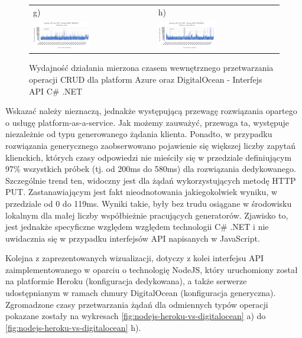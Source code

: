 \begin{figure}[htb]
\begin{tabular}{@{}ll@{}}
    g) & h) \\
    \includegraphics[width=0.49\textwidth]{rys05/dotnet-delete-azure.pdf} & \includegraphics[width=0.49\textwidth]{rys05/dotnet-delete-digitalocean.pdf} \\
	\end{tabular}
  \caption{Wydajność działania mierzona czasem wewnętrznego przetwarzania operacji CRUD dla platform Azure oraz DigitalOcean - Interfejs API C\# .NET}
  \label{fig:dotnet-azure-vs-digitalocean}
\end{figure}

Wskazać należy nieznaczą, jednakże występującą przewagę rozwiązania opartego o usługę platform-as-a-service. Jak możemy zauważyć, przewaga ta, występuje niezależnie od typu generowanego żądania klienta. Ponadto, w przypadku rozwiązania generycznego zaobserwowano pojawienie się większej liczby zapytań klienckich, których czasy odpowiedzi nie mieściły się w przedziale definiującym 97\% wszystkich próbek (tj. od 200ms do 580ms) dla rozwiązania dedykowanego. Szczególnie trend ten, widoczny jest dla żądań wykorzystujących metodę HTTP PUT. Zastanawiającym jest fakt nieodnotowania jakiegokolwiek wyniku, w przedziale od 0 do 119ms. Wyniki takie, były bez trudu osiągane w środowisku lokalnym dla małej liczby współbieżnie pracujących generatorów. Zjawisko to, jest jednakże specyficzne względem względem technologii C\# .NET i nie uwidacznia się w przypadku interfejsów API napisanych w JavaScript.

Kolejna z zaprezentowanych wizualizacji, dotyczy z kolei interfejsu API zaimplementowanego w oparciu o technologię NodeJS, który uruchomiony został na platformie Heroku (konfiguracja dedykowana), a także serwerze udostępnianym w ramach chmury DigitalOcean (konfiguracja generyczna). Zgromadzone czasy przetwarzania żądań dla odmiennych typów operacji pokazane zostały na wykresach \ref{fig:nodejs-heroku-vs-digitalocean} a) do \ref{fig:nodejs-heroku-vs-digitalocean} h).

